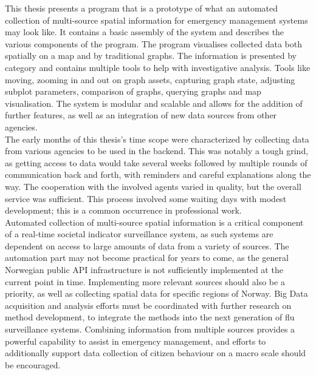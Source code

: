 This thesis presents a program that is a prototype of what an automated collection of multi-source spatial information for emergency management systems may look like. It contains a basic assembly of the system and describes the various components of the program. The program visualises collected data both spatially on a map and by traditional graphs. The information is presented by category and contains multiple tools to help with investigative analysis. Tools like moving, zooming in and out on graph assets, capturing graph state, adjusting subplot parameters, comparison of graphs, querying graphs and map visualisation. The system is modular and scalable and allows for the addition of further features, as well as an integration of new data sources from other agencies.\\

The early months of this thesis's time scope were characterized by collecting data from various agencies to be used in the backend. This was notably a tough grind, as getting access to data would take several weeks followed by multiple rounds of communication back and forth, with reminders and careful explanations along the way. The cooperation with the involved agents varied in quality, but the overall service was sufficient. This process involved some waiting days with modest development; this is a common occurrence in professional work.\\

Automated collection of multi-source spatial information is a critical component of a real-time societal indicator surveillance system, as such systems are dependent on access to large amounts of data from a variety of sources. The automation part may not become practical for years to come, as the general Norwegian public API infrastructure is not sufficiently implemented at the current point in time. Implementing more relevant sources should also be a priority, as well as collecting spatial data for specific regions of Norway. Big Data acquisition and analysis efforts must be coordinated with further research on method development, to integrate the methods into the next generation of flu surveillance systems. Combining information from multiple sources provides a powerful capability to assist in emergency management, and efforts to additionally support data collection of citizen behaviour on a macro scale should be encouraged.





